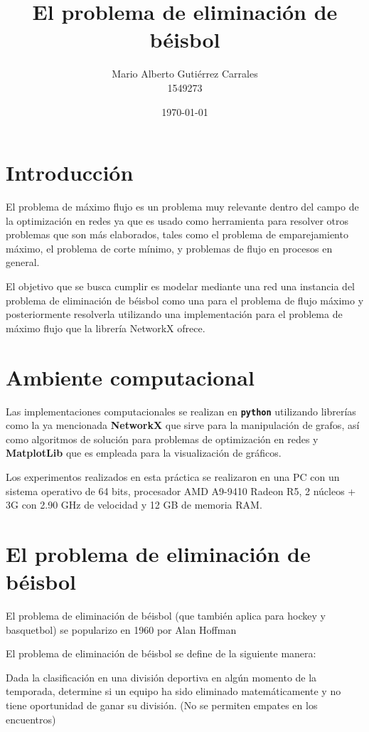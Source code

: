 \documentclass[12pt]{article}
\title{\textbf{El problema de eliminación de béisbol}}
\author{Mario Alberto Gutiérrez Carrales \\ 1549273}
\date{\today}
\begin{document}
\maketitle

\section{Introducción}

El problema de máximo flujo es un problema muy relevante dentro del campo de la optimización en redes ya que es usado como herramienta para resolver otros problemas que son más elaborados, tales como el problema de emparejamiento máximo, el problema de corte mínimo, y problemas de flujo en procesos en general. 

El objetivo que se busca cumplir es modelar mediante una red una instancia del problema de eliminación de béisbol como una para el problema de flujo máximo y posteriormente resolverla utilizando una implementación para el problema de máximo flujo que la librería NetworkX ofrece.


\section{Ambiente computacional}

Las implementaciones computacionales se realizan en \textbf{\texttt{python}} \cite{Python} utilizando librerías como la ya mencionada \textbf{NetworkX} \cite{Net} que sirve para la manipulación de grafos, así como algoritmos de solución para problemas de optimización en redes y  \textbf{MatplotLib} \cite{Mat} que es empleada para la visualización de gráficos. 

Los experimentos realizados en esta práctica se realizaron en una PC con un sistema operativo de 64 bits, procesador AMD A9-9410 Radeon R5, 2 núcleos + 3G con 2.90 GHz de velocidad y 12 GB de memoria RAM.

\section{El problema de eliminación de béisbol}

El problema de eliminación de béisbol (que también aplica para hockey y basquetbol) se popularizo en 1960 por Alan Hoffman \cite{R1,R2,R3}

El problema de eliminación de béisbol se define de la siguiente manera:

Dada la clasificación en una división deportiva en algún momento de la temporada, determine si un equipo ha sido eliminado matemáticamente y no tiene oportunidad de ganar su división. (No se permiten empates en los encuentros)
\end{document}
